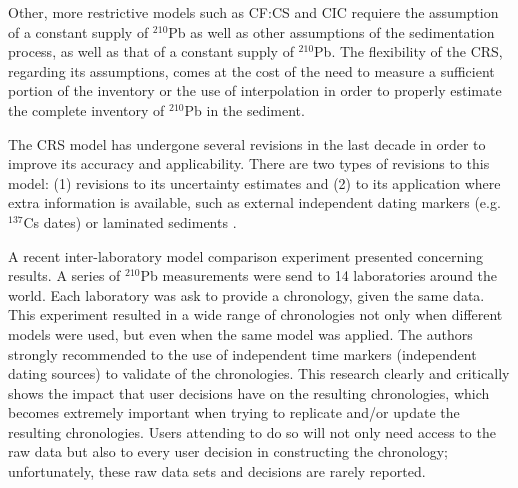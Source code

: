 \documentclass [10pt] {article}
\begin{document}
Other, more restrictive models such as CF:CS and CIC requiere the assumption of a constant supply of $^{210}$Pb as well as other assumptions of the sedimentation process, as well as that of a constant supply of $^{210}$Pb.
The flexibility of the CRS, regarding its assumptions, comes at the cost of the need to measure a sufficient portion of the inventory or the use of interpolation in order to properly estimate the complete inventory of $^{210}$Pb in the sediment. 

The CRS model has undergone several revisions in the last decade in order to improve its accuracy and applicability. 
There are two types of revisions to this model: (1) revisions to its uncertainty estimates \citep{Binford1990,Appleby2001,Sanchez-Cabeza2014} and (2) to its application where extra information is available, such as external independent dating markers (e.g. $^{137}$Cs dates) or laminated sediments \citep{Appleby1998,Appleby2001,Appleby2008}.

A recent inter-laboratory model comparison experiment \citep{Barsanti2020} presented concerning results.
A series of $^{210}$Pb measurements were send to 14 laboratories around the world.
Each laboratory was ask to provide a chronology, given the same data.
This experiment resulted in a wide range of chronologies not only when different models were used, but even when the same model was applied.
The authors strongly recommended to the use of independent time markers (independent dating sources) to validate of the chronologies.
This research clearly and critically shows the impact that user decisions have on the resulting chronologies, which becomes extremely important when trying to replicate and/or update the resulting chronologies.
Users attending to do so will not only need access to the raw data but also to every user decision in constructing the chronology; unfortunately, these raw data sets and decisions are rarely reported.
\end{document}
